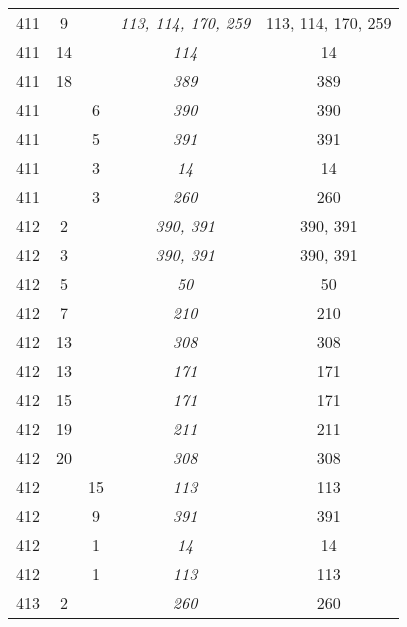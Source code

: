\documentclass[a4paper,11pt]{article}
\begin{document}
\begin{center}
\begin{tabular}{|c|c|c|c|c|}
    411 &  9 & & \textit{113, 114, 170, 259} & 113, 114, 170, 259 \\
    411 & 14 & & \textit{114} & 14 \\
    411 & 18 & & \textit{389} & 389 \\
    411 & &  6 & \textit{390} & 390 \\
    411 & &  5 & \textit{391} & 391 \\
    411 & &  3 & \textit{14}  & 14 \\
    411 & &  3 & \textit{260} & 260 \\
    412 &  2 & & \textit{390, 391} & 390, 391 \\
    412 &  3 & & \textit{390, 391} & 390, 391 \\
    412 &  5 & & \textit{50}  & 50 \\
    412 &  7 & & \textit{210} & 210 \\
    412 & 13 & & \textit{308} & 308 \\
    412 & 13 & & \textit{171} & 171 \\
    412 & 15 & & \textit{171} & 171 \\
    412 & 19 & & \textit{211} & 211 \\
    412 & 20 & & \textit{308} & 308 \\
    412 & & 15 & \textit{113} & 113 \\
    412 & &  9 & \textit{391} & 391 \\
    412 & &  1 & \textit{14}  & 14 \\
    412 & &  1 & \textit{113} & 113 \\
    413 &  2 & & \textit{260} & 260 \\
    \hline
  \end{tabular}






\end{center}
\end{document}
